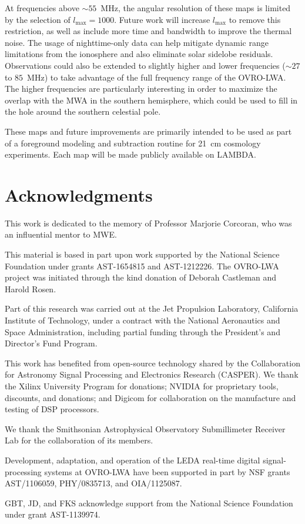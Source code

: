 \begin{bibunit}
At frequencies above $\sim55$~MHz, the angular resolution of these maps is limited by the selection
of $l_\text{max}=1000$. Future work will increase $l_\text{max}$ to remove this restriction, as well
as include more time and bandwidth to improve the thermal noise. The usage of nighttime-only data
can help mitigate dynamic range limitations from the ionosphere and also eliminate solar sidelobe
residuals. Observations could also be extended to slightly higher and lower frequencies ($\sim27$ to
$85$~MHz) to take advantage of the full frequency range of the OVRO-LWA. The higher frequencies are
particularly interesting in order to maximize the overlap with the MWA in the southern hemisphere,
which could be used to fill in the hole around the southern celestial pole.

These maps and future improvements are primarily intended to be used as part of a foreground
modeling and subtraction routine for 21~cm cosmology experiments. Each map will be made publicly
available on LAMBDA.

\section*{Acknowledgments}
This work is dedicated to the memory of Professor Marjorie Corcoran, who was an influential mentor
to MWE.

This material is based in part upon work supported by the National Science Foundation under grants
AST-1654815 and AST-1212226. The OVRO-LWA project was initiated through the kind donation of Deborah
Castleman and Harold Rosen.

Part of this research was carried out at the Jet Propulsion Laboratory, California Institute of
Technology, under a contract with the National Aeronautics and Space Administration, including
partial funding through the President's and Director's Fund Program.

This work has benefited from open-source technology shared by the Collaboration for Astronomy Signal
Processing and Electronics Research (CASPER).  We thank the Xilinx University Program for donations;
NVIDIA for proprietary tools, discounts, and donations; and Digicom for collaboration on the
manufacture and testing of DSP processors.

We thank the Smithsonian Astrophysical Observatory Submillimeter Receiver Lab for the collaboration
of its members.

Development, adaptation, and operation of the LEDA real-time digital signal-processing systems at
OVRO-LWA have been supported in part by NSF grants AST/1106059, PHY/0835713, and OIA/1125087.

GBT, JD, and FKS acknowledge support from the National Science Foundation under grant AST-1139974.

\end{bibunit}


